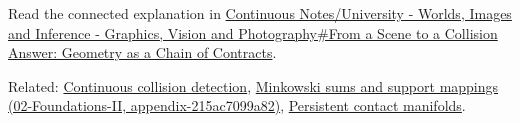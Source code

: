 Read the connected explanation in \href{Continuous\%20Notes/University\%20-\%20Worlds,\%20Images\%20and\%20Inference\%20-\%20Graphics,\%20Vision\%20and\%20Photography\#From\%20a\%20Scene\%20to\%20a\%20Collision\%20Answer:\%20Geometry\%20as\%20a\%20Chain\%20of\%20Contracts}{Continuous Notes/University - Worlds, Images and Inference - Graphics, Vision and Photography\#From a Scene to a Collision Answer: Geometry as a Chain of Contracts}.

Related: \hyperref[appendix-66956ed6c753]{Continuous collision detection}, \href{}{Minkowski sums and support mappings (02-Foundations-II, appendix-215ac7099a82)}, \href{Continuous\%20Notes/Game\%20Engine\%20-\%20From\%20First\%20Frame\%20to\%20Living\%20Worlds\#Complete\%20persistent-contact\%20implementation\%20and\%20cache\%20policy}{Persistent contact manifolds}.
